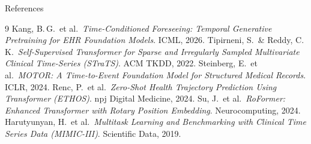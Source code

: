 \documentclass[10pt, aspectratio=169, t]{beamer}   %
\begin{document}
\begin{frame}{References}
  \small
  \begin{thebibliography}{9}
     Kang, B.\,G.\ et al.\ \emph{Time-Conditioned Foreseeing: Temporal Generative Pretraining for EHR Foundation Models}. ICML, 2026.
     Tipirneni, S.\ \& Reddy, C.\,K.\ \emph{Self-Supervised Transformer for Sparse and Irregularly Sampled Multivariate Clinical Time-Series (STraTS)}. ACM TKDD, 2022.
     Steinberg, E.\ et al.\ \emph{MOTOR: A Time-to-Event Foundation Model for Structured Medical Records}. ICLR, 2024.
     Renc, P.\ et al.\ \emph{Zero-Shot Health Trajectory Prediction Using Transformer (ETHOS)}. npj Digital Medicine, 2024.
     Su, J.\ et al.\ \emph{RoFormer: Enhanced Transformer with Rotary Position Embedding}. Neurocomputing, 2024.
     Harutyunyan, H.\ et al.\ \emph{Multitask Learning and Benchmarking with Clinical Time Series Data (MIMIC-III)}. Scientific Data, 2019.
  \end{thebibliography}
\end{frame}
\end{document}

